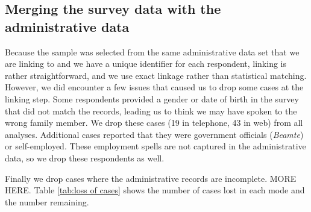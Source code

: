 

\subsection{Merging the survey data with the administrative data}\label{mergeing}

Because the sample was selected from the same administrative data set that we are linking to and we have a unique identifier for each respondent, linking is rather straightforward, and we use exact linkage rather than statistical matching. However, we did encounter a few issues that caused us to drop some cases at the linking step. Some respondents provided a gender or date of birth in the survey that did not match the records, leading us to think we may have spoken to the wrong family member. We drop these cases (19 in telephone, 43 in web) from all analyses. Additional cases reported that they were government officials (\textit{Beamte}) or self-employed. These employment spells are not captured in the administrative data, so we drop these respondents as well.

Finally we drop cases where the administrative records are incomplete. MORE HERE. Table \ref{tab:loss of cases} shows the number of cases lost in each mode and the number remaining. 



